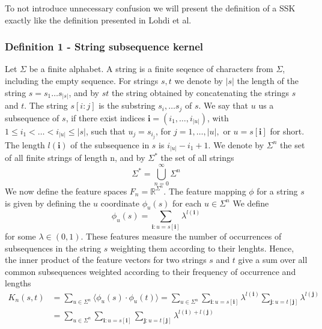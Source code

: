 To not introduce unnecessary confusion we will present the definition of a SSK exactly like the definition presented in Lohdi et al. 

\subsubsection{Definition 1 - String subsequence kernel}
Let $ \Sigma $ be a finite alphabet. A string is a finite seqence of characters from $ \Sigma $, including the empty sequence. For strings $s,t$ we denote by $|s|$ the length of the string $ s = s_1 \dots s_{|s|} $, and by $ st $ the string obtained by concatenating the strings $ s $ and $ t $. The string $ s[i:j] $ is the substring $ s_i, \dots s_j $ of $ s $. We say that $ u $ us a subsequence of $ s $, if there exist indices $ \boldsymbol{i} = (i_1, \dots, i_{|u|}) $, with $ 1 \leq i_1 < \dots < i_{|u|} \leq |s| $, such that $ u_j = s_{i_{j}}$, for $ j = 1, \dots, |u|, $ or $ u = s[\boldsymbol{i}] $ for short. The length $ l(\boldsymbol{i}) $ of the subsequence in $ s $ is $ i_{|u|} - i_1 +1 $. We denote by $ \Sigma^n $ the set of all finite strings of length n, and by $ \Sigma^* $ the set of all strings 
\begin{equation}\label{eq:all_Strings}
\Sigma^* = \bigcup^{\infty}_{n=0}\Sigma^n
\end{equation}
We now define the feature spaces $ F_n = \mathbb{R}^{\Sigma^{n}} $. The feature mapping $ \phi $ for a string $ s $ is given by defining the $ u $ coordinate $ \phi_u(s) $ for each $u \in \Sigma^n  $ We define 
\begin{equation}
\phi_u(s) = \sum_{\boldsymbol{i}:u=s[\boldsymbol{i}]} \lambda^{l(\boldsymbol{i})}
\end{equation}
for some $ \lambda \in (0,1) $. These features measure the number of occurrences of subsequences in the string $ s $ weighting them according to their lenghts. Hence, the inner product of the feature vectors for two strings $ s $ and $ t $ give a sum over all common subsequences weighted according to their frequency of occurrence and lengths
\begin{align*}\label{key}
K_n(s,t) &= \sum_{u\in\Sigma^n} \langle \phi_u(s) \cdot \phi_u(t) \rangle = \sum_{u \in \Sigma^n} \sum_{\boldsymbol{i}:u=s[\boldsymbol{i}]} \lambda^{l(\boldsymbol{i})} \sum_{\boldsymbol{j}:u=t[\boldsymbol{j}]} \lambda^{l(\boldsymbol{j})} \\
& =  \sum_{u \in \Sigma^n} \sum_{\boldsymbol{i}:u=s[\boldsymbol{i}]}  \sum_{\boldsymbol{j}:u=t[\boldsymbol{j}]} \lambda^{l(\boldsymbol{i}) + l(\boldsymbol{j})}
\end{align*}


